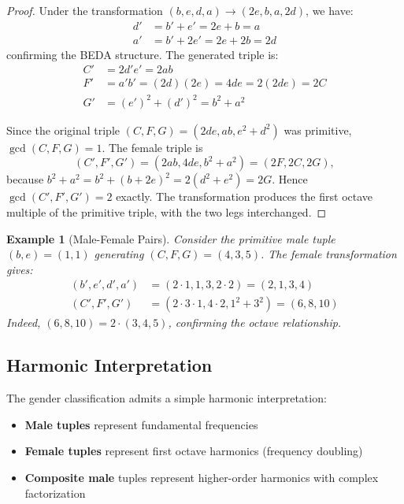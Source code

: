 \documentclass[12pt]{article}
\newtheorem{example}{Example}
\begin{document}
\begin{proof}
Under the transformation $(b, e, d, a) \to (2e, b, a, 2d)$, we have:
\begin{align*}
d' &= b' + e' = 2e + b = a\\
a' &= b' + 2e' = 2e + 2b = 2d
\end{align*}
confirming the BEDA structure. The generated triple is:
\begin{align*}
C' &= 2d'e' = 2ab\\
F' &= a'b' = (2d)(2e) = 4de = 2(2de) = 2C\\
G' &= (e')^2 + (d')^2 = b^2 + a^2
\end{align*}

Since the original triple $(C, F, G) = (2de, ab, e^2 + d^2)$ was primitive, $\gcd(C, F, G) = 1$. The female triple is
\[
(C',F',G')=(2ab,4de,b^2+a^2)=(2F,2C,2G),
\]
because $b^2+a^2=b^2+(b+2e)^2=2(d^2+e^2)=2G$. Hence $\gcd(C',F',G')=2$ exactly. The transformation produces the first octave multiple of the primitive triple, with the two legs interchanged.
\end{proof}

\begin{example}[Male-Female Pairs]
Consider the primitive male tuple $(b,e) = (1,1)$ generating $(C,F,G) = (4,3,5)$. The female transformation gives:
\begin{align*}
(b', e', d', a') &= (2 \cdot 1, 1, 3, 2 \cdot 2) = (2, 1, 3, 4)\\
(C', F', G') &= (2 \cdot 3 \cdot 1, 4 \cdot 2, 1^2 + 3^2) = (6, 8, 10)
\end{align*}
Indeed, $(6,8,10) = 2 \cdot (3,4,5)$, confirming the octave relationship.
\end{example}

\subsection{Harmonic Interpretation}

The gender classification admits a simple harmonic interpretation:

\begin{itemize}
\item \textbf{Male tuples} represent fundamental frequencies
\item \textbf{Female tuples} represent first octave harmonics (frequency doubling)
\item \textbf{Composite male} tuples represent higher-order harmonics with complex factorization
\end{itemize}
\end{document}
